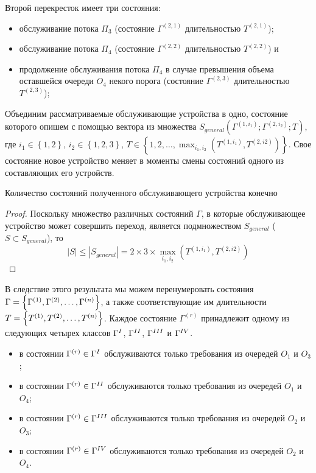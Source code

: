 \documentclass[a4paper,14pt,russian]{article}
\newcommand{\G}{\Gamma}
\newcommand{\gam}[2]{\Gamma^{\left( #1 , #2 \right)} }
\newcommand{\T}[2]{T^{\left( #1 , #2 \right)} }
\begin{document}
Второй перекресток имеет три состояния:
\begin{itemize}
\item обслуживание потока $\Pi_3$ (состояние $\gam{2}{1}$ длительностью $\T{2}{1}$);
\item обслуживание потока $\Pi_4$ (состояние $\gam{2}{2}$ длительностью $\T{2}{2}$) и
\item продолжение обслуживания потока $\Pi_4$ в случае 
превышения объема оставшейся очереди $O_4$ некого порога (состояние $\gam{2}{3}$ длительностью $\T{2}{3}$);
\end{itemize}


Объединим рассматриваемые обслуживающие устройства в одно, состояние которого опишем с помощью вектора из множества $S_{general}\left(\Gamma^{(1,i_1)}; \Gamma^{(2,i_2)}; T\right)$, где $i_1\in \left\{1,2\right\}$, $i_2 \in \left\{1,2,3\right\}$, $T\in \left\{1, 2, \ldots, \max_{i_1,i_2}{\left(T^{(1,i_1)}, T^{(2,i2)}\right)}\right\}$. Свое состояние новое устройство меняет в моменты смены состояний одного из составляющих его устройств.

\begin{theorem}
Количество состояний полученного обслуживающего устройства конечно
\end{theorem}
\begin{proof}
Поскольку множество различных состояний $\Gamma$, в которые обслуживающее устройство может совершить переход, является подмножеством $S_{general}$ ($S \subset S_{general}$), то
\begin{equation*}
\left|S\right| \leqslant \left|S_{general}\right| = 2\times 3 \times \max_{i_1,i_2}{\left(T^{(1,i_1)}, T^{(2,i2)}\right)}
\end{equation*}
\end{proof}

В следствие этого результата мы можем перенумеровать состояния $\G = \brrr{\G^{(1)},\G^{(2)}, \ldots, \G^{(n)}}$, а также соответствующие им длительности $T=\left\{T^{(1)},T^{(2)}, \ldots, T^{(n)}\right\}$.
Каждое состояние $\G^{(r)}$ принадлежит одному из следующих четырех классов $\G^{\Rmnum{1}}$, $\G^{\Rmnum{2}}$, $\G^{\Rmnum{3}}$ и $\G^{\Rmnum{4}}$.
\begin{itemize}
\item в состоянии $\G^{(r)} \in \G^{\Rmnum{1}}$ обслуживаются только требования из очередей $O_1$ и $O_3$;
\item в состоянии $\G^{(r)} \in \G^{\Rmnum{2}}$ обслуживаются только требования из очередей $O_1$ и $O_4$;
\item в состоянии $\G^{(r)} \in \G^{\Rmnum{3}}$ обслуживаются только требования из очередей $O_2$ и $O_3$;
\item в состоянии $\G^{(r)} \in \G^{\Rmnum{4}}$ обслуживаются только требования из очередей $O_2$ и $O_4$.
\end{itemize}
\end{document}
